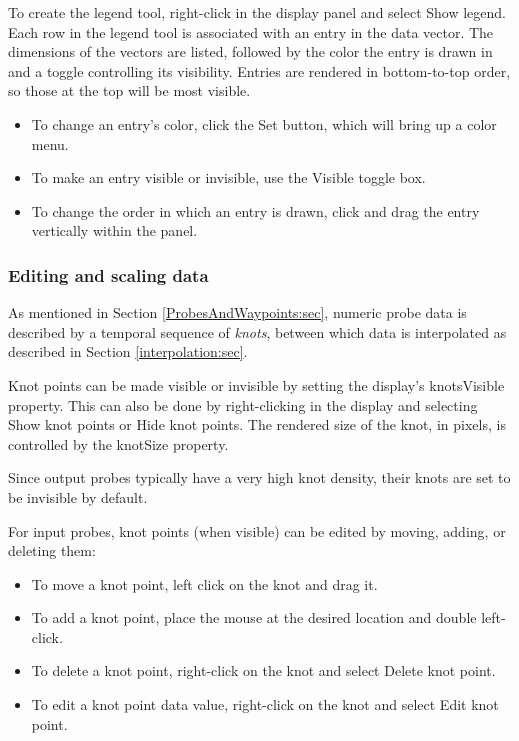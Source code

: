 \documentclass{article}
\begin{document}
To create the legend tool, right-click in the display panel and select
{\sf Show legend}. Each row in the legend tool is associated with an
entry in the data vector. The dimensions of the vectors are listed,
followed by the color the entry is drawn in and a toggle controlling
its visibility.  Entries are rendered in bottom-to-top order, so those
at the top will be most visible.

\begin{itemize}

\item To change an entry's color, click the {\sf Set} button, which
will bring up a color menu.

\item To make an entry visible or invisible, use the {\sf Visible}
toggle box.

\item To change the order in which an entry is drawn, click and drag the
entry vertically within the panel.

\end{itemize}

\subsubsection{Editing and scaling data}
\label{EditingData:sec}

As mentioned in Section \ref{ProbesAndWaypoints:sec}, numeric probe data
is described by a temporal sequence of {\it knots}, between which data
is interpolated as described in Section \ref{interpolation:sec}.

Knot points can be made visible or invisible by setting the display's
{\sf knotsVisible} property. This can also be done by right-clicking
in the display and selecting {\sf Show knot points} or {\sf Hide knot
points}. The rendered size of the knot, in pixels, is controlled by
the {\sf knotSize} property.

\begin{sideblock}
Since output probes typically have a very high knot density, their
knots are set to be invisible by default.
\end{sideblock}

For input probes, knot points (when visible) can be edited by moving,
adding, or deleting them:

\begin{itemize}

\item To move a knot point, left click on the knot and drag it.

\item To add a knot point, place the mouse at the desired location
and double left-click.

\item To delete a knot point, right-click on the knot and select 
{\sf Delete knot point}.

\item To edit a knot point data value, right-click on the knot and
select {\sf Edit knot point}.

\end{itemize}
\end{document}
